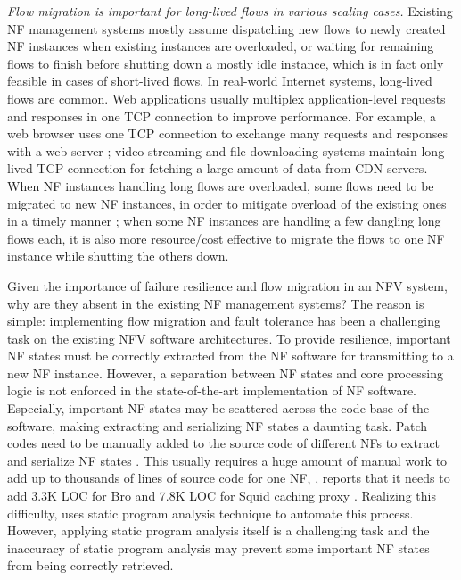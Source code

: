 {\em Flow migration is important for long-lived flows in various scaling cases.} Existing NF management systems mostly assume dispatching new flows to newly created NF instances when existing instances are overloaded, or waiting for remaining flows to finish before shutting down a mostly idle instance, which is in fact only feasible in cases of short-lived flows. In real-world Internet systems, long-lived flows are common. Web applications %
 usually multiplex application-level requests and responses in
one TCP connection to improve performance. For example, a web browser uses one TCP connection to exchange many requests and responses with a
web server \cite{http-keep-alive}; video-streaming
\cite{ffmpeg} and file-downloading \cite{ftp} systems maintain long-lived TCP
connection for fetching a large amount of data from CDN servers. %
 When NF instances handling long flows are overloaded, some flows need to be migrated to new NF instances, in order to mitigate overload of the existing ones in a timely manner \cite{gember2015opennf}; when some NF instances are handling a few dangling long flows each, it is also more resource/cost effective to migrate the flows to one NF instance while shutting the others down. 


Given the importance of failure resilience and flow migration in an NFV system, why are they absent in the existing NF management systems? The reason is simple: implementing flow migration and fault
tolerance has been a challenging task on the existing NFV software architectures. To provide resilience, important NF states must be correctly extracted from the NF software for transmitting to a new NF instance. However, a separation between NF states and core processing logic is not enforced in the state-of-the-art implementation of NF software. Especially, important NF states may be scattered across the code base of the software, making
extracting and serializing NF states a daunting task. Patch codes need to be
manually added to the source code of different NFs to extract and serialize NF
states \cite{gember2015opennf}\cite{rajagopalan2013split}. This usually requires a huge amount of manual work to add up to
thousands of lines of source code for one NF, \eg, \cite{gember2015opennf} reports
that it needs to add 3.3K LOC for Bro \cite{bro} and 7.8K LOC for Squid caching
proxy \cite{squid}.  Realizing this difficulty, \cite{khalid2016paving} uses
static program analysis technique to automate this process. However, applying
static program analysis itself is a challenging task and the inaccuracy of 
static program analysis may prevent some important NF states from being
correctly retrieved. 

